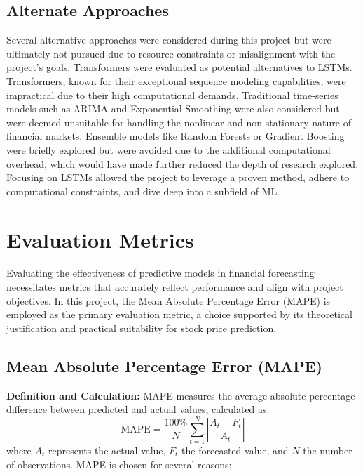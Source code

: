 \documentclass[10pt,twocolumn]{article}
\begin{document}
\subsection{Alternate Approaches}

Several alternative approaches were considered during this project but were ultimately not pursued due to resource constraints or misalignment with the project’s goals. Transformers were evaluated as potential alternatives to LSTMs. Transformers, known for their exceptional sequence modeling capabilities, were impractical due to their high computational demands. Traditional time-series models such as ARIMA and Exponential Smoothing were also considered but were deemed unsuitable for handling the nonlinear and non-stationary nature of financial markets. Ensemble models like Random Forests or Gradient Boosting were briefly explored but were avoided due to the additional computational overhead, which would have made further reduced the depth of research explored. Focusing on LSTMs allowed the project to leverage a proven method, adhere to computational constraints, and dive deep into a subfield of ML.

\section{Evaluation Metrics}

Evaluating the effectiveness of predictive models in financial forecasting necessitates metrics that accurately reflect performance and align with project objectives. In this project, the Mean Absolute Percentage Error (MAPE) is employed as the primary evaluation metric, a choice supported by its theoretical justification and practical suitability for stock price prediction.

\subsection{Mean Absolute Percentage Error (MAPE)}

\textbf{Definition and Calculation:}  
MAPE measures the average absolute percentage difference between predicted and actual values, calculated as:
\[
\text{MAPE} = \frac{100\%}{N} \sum_{t=1}^{N} \left| \frac{A_t - F_t}{A_t} \right|
\]
where \( A_t \) represents the actual value, \( F_t \) the forecasted value, and \( N \) the number of observations. MAPE is chosen for several reasons:
\end{document}
